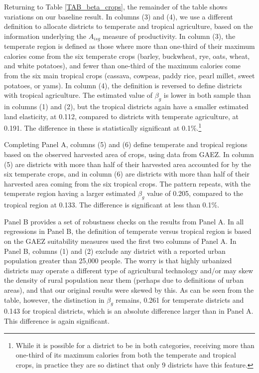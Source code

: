 \documentclass[11pt]{article}
\begin{document}
Returning to Table \ref{TAB_beta_crops}, the remainder of the table shows variations on our baseline result. In columns (3) and (4), we use a different definition to allocate districts to temperate and tropical agriculture, based on the information underlying the $A_{isg}$ measure of productivity. In column (3), the temperate region is defined as those where more than one-third of their maximum calories come from the six temperate crops (barley, buckwheat, rye, oats, wheat, and white potatoes), and fewer than one-third of the maximum calories come from the six main tropical crops (cassava, cowpeas, paddy rice, pearl millet, sweet potatoes, or yams). In column (4), the definition is reversed to define districts with tropical agriculture. The estimated value of $\beta_g$ is lower in both sample than in columns (1) and (2), but the tropical districts again have a smaller estimated land elasticity, at 0.112, compared to districts with temperate agriculture, at 0.191. The difference in these is statistically significant at 0.1\%.\footnote{While it is possible for a district to be in both categories, receiving more than one-third of its maximum calories from both the temperate and tropical crops, in practice they are so distinct that only 9 districts have this feature.}

Completing Panel A, columns (5) and (6) define temperate and tropical regions based on the observed harvested area of crops, using data from GAEZ. In column (5) are districts with more than half of their harvested area accounted for by the six temperate crops, and in column (6) are districts with more than half of their harvested area coming from the six tropical crops. The pattern repeats, with the temperate region having a larger estimated $\beta_g$ value of 0.205, compared to the tropical region at 0.133. The difference is significant at less than 0.1\%.

Panel B provides a set of robustness checks on the results from Panel A. In all regressions in Panel B, the definition of temperate versus tropical region is based on the GAEZ suitability measures used the first two columns of Panel A. In Panel B, columns (1) and (2) exclude any district with a reported urban population greater than 25,000 people. The worry is that highly urbanized districts may operate a different type of agricultural technology and/or may skew the density of rural population near them (perhaps due to definitions of urban areas), and that our original results were skewed by this. As can be seen from the table, however, the distinction in $\beta_g$ remains, 0.261 for temperate districts and 0.143 for tropical districts, which is an absolute difference larger than in Panel A. This difference is again significant.
\end{document}
